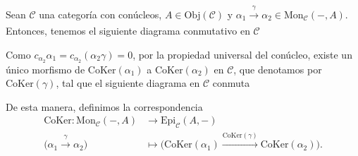 \documentclass[tesis]{subfiles}
\begin{document}
\begin{Def}\label{Def: Funtor CoKer}
    Sean $\mathscr{C}$ una categoría con conúcleos, $A\in\text{Obj}(\mathscr{C})$ y $\alpha_1\xrightarrow[]{\gamma}\alpha_2\in\text{Mon}_\mathscr{C}(-,A)$. Entonces, tenemos el siguiente diagrama conmutativo en $\mathscr{C}$
    \begin{center}
    \end{center}
    Como $c_{\alpha_2} \alpha_1 = c_{\alpha_2}(\alpha_2\gamma) = 0$, por la propiedad universal del conúcleo, existe un único morfismo de $\text{CoKer}(\alpha_1)$ a $\text{CoKer}(\alpha_2)$ en $\mathscr{C}$, que denotamos por $\text{CoKer}(\gamma)$, tal que el siguiente diagrama en $\mathscr{C}$ conmuta
    \begin{center}
    \end{center}
    De esta manera, definimos la correspondencia
    \begin{align*}
        \text{CoKer}:\text{Mon}_\mathscr{C}(-,A) &\to \text{Epi}_\mathscr{C}(A,-) \\
        \big(\alpha_1\xrightarrow[]{\gamma}\alpha_2\big) &\mapsto \big( \text{CoKer}(\alpha_1)\xrightarrow[]{\text{CoKer}(\gamma)} \text{CoKer}(\alpha_2)\big).
    \end{align*}
\end{Def}
\end{document}
